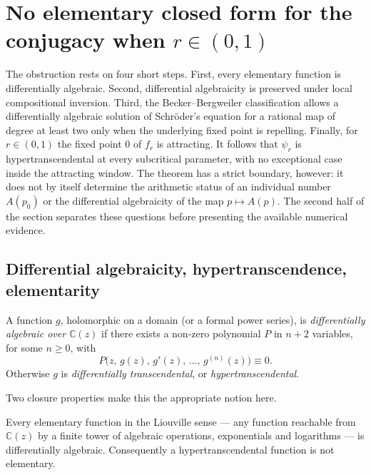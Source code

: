 \section{No elementary closed form for the conjugacy when \texorpdfstring{$r\in(0,1)$}{r in (0,1)}}
\label{a:sec:ncf-main}

The obstruction rests on four short steps.  First, every elementary function is
differentially algebraic.  Second, differential algebraicity is preserved under
local compositional inversion.  Third, the Becker--Bergweiler classification
allows a differentially algebraic solution of Schr\"oder's equation for a rational
map of degree at least two only when the underlying fixed point is repelling.
Finally, for $r\in(0,1)$ the fixed point $0$ of $f_r$ is attracting.  It follows
that $\psi_r$ is hypertranscendental at every subcritical parameter, with no
exceptional case inside the attracting window.  The theorem has a strict boundary,
however: it does not by itself determine the arithmetic status of an individual
number $A(p_0)$ or the differential algebraicity of the map $p\mapsto A(p)$.  The
second half of the section separates these questions before presenting the
available numerical evidence.

\subsection{Differential algebraicity, hypertranscendence, elementarity}

\begin{definition}
\label{a:def:da}
A function $g$, holomorphic on a domain (or a formal power series), is \emph{differentially algebraic over $\mathbb{C}(z)$} if there exists a non-zero polynomial $P$ in $n+2$ variables, for some $n\ge0$, with
\[
P\bigl(z,\,g(z),\,g'(z),\,\dots,\,g^{(n)}(z)\bigr)\equiv 0 .
\]
Otherwise $g$ is \emph{differentially transcendental}, or \emph{hypertranscendental}.
\end{definition}

Two closure properties make this the appropriate notion here.

\begin{lemma}
\label{a:lem:elem-da}
Every elementary function in the Liouville sense --- any function reachable from $\mathbb{C}(z)$ by a finite tower of algebraic operations, exponentials and logarithms --- is differentially algebraic. Consequently a hypertranscendental function is not elementary.
\end{lemma}

